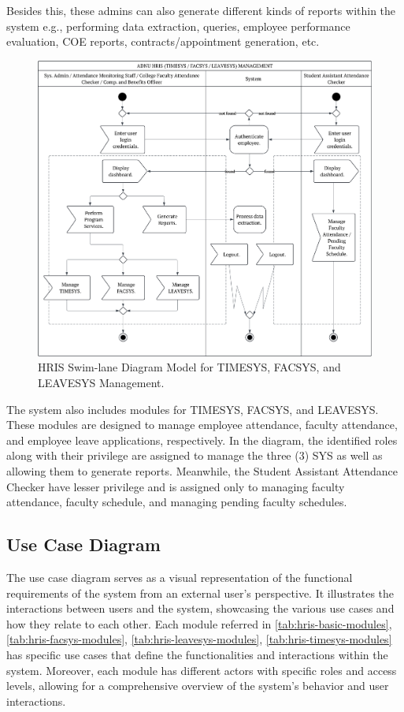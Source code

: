     Besides this, these admins can also generate different kinds of reports within the system e.g., performing data extraction, queries, employee performance evaluation, COE reports, contracts/appointment generation, etc.

    \begin{figure}[H]
        \centering
        \includegraphics[width=1\linewidth]{figures/images/swimlane-sys-mgt.png}
        \caption{HRIS Swim-lane Diagram Model for TIMESYS, FACSYS, and LEAVESYS Management.}
        \label{fig:swimlane-sys-mgt}
    \end{figure}

    The system also includes modules for TIMESYS, FACSYS, and LEAVESYS. These modules are designed to manage employee attendance, faculty attendance, and employee leave applications, respectively. In the diagram, the identified roles along with their privilege are assigned to manage the three (3) SYS as well as allowing them to generate reports. Meanwhile, the Student Assistant Attendance Checker have lesser privilege and is assigned only to managing faculty attendance, faculty schedule, and managing pending faculty schedules.

    \subsection{Use Case Diagram}
    
    The use case diagram serves as a visual representation of the functional requirements of the system from an external user's perspective. It illustrates the interactions between users and the system, showcasing the various use cases and how they relate to each other. Each module referred in \ref*{tab:hris-basic-modules}, \ref*{tab:hris-facsys-modules}, \ref*{tab:hris-leavesys-modules}, \ref*{tab:hris-timesys-modules} has specific use cases that define the functionalities and interactions within the system. Moreover, each module has different actors with specific roles and access levels, allowing for a comprehensive overview of the system's behavior and user interactions.
    
